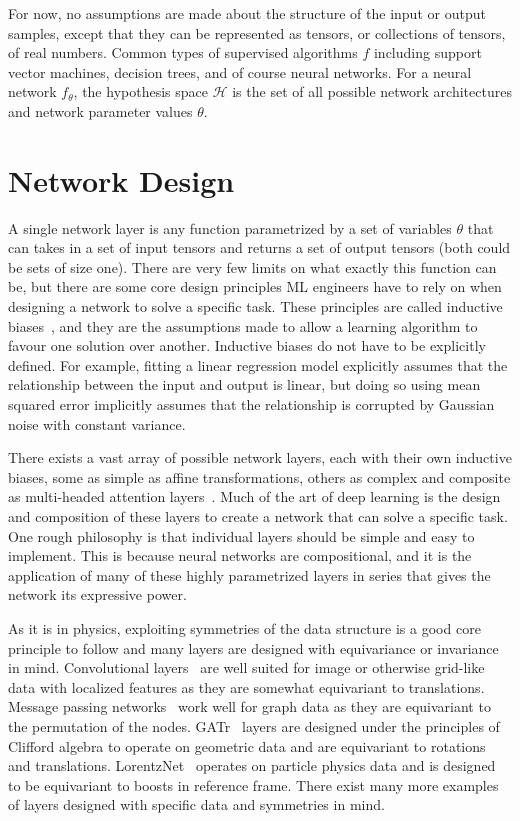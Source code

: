 For now, no assumptions are made about the structure of the input or output samples, except that they can be represented as tensors, or collections of tensors, of real numbers.
Common types of supervised algorithms $f$ including support vector machines, decision trees, and of course neural networks.
For a neural network $f_{\theta}$, the hypothesis space $\mathcal{H}$ is the set of all possible network architectures and network parameter values $\theta$.

\section{Network Design}

A single network layer is any function parametrized by a set of variables $\theta$ that can takes in a set of input tensors and returns a set of output tensors (both could be sets of size one).
There are very few limits on what exactly this function can be, but there are some core design principles ML engineers have to rely on when designing a network to solve a specific task.
These principles are called inductive biases~\cite{InductiveBiases1, InductiveBiases2}, and they are the assumptions made to allow a learning algorithm to favour one solution over another.
Inductive biases do not have to be explicitly defined.
For example, fitting a linear regression model explicitly assumes that the relationship between the input and output is linear, but doing so using mean squared error implicitly assumes that the relationship is corrupted by Gaussian noise with constant variance.

There exists a vast array of possible network layers, each with their own inductive biases, some as simple as affine transformations, others as complex and composite as multi-headed attention layers~\cite{Attention}.
Much of the art of deep learning is the design and composition of these layers to create a network that can solve a specific task.
One rough philosophy is that individual layers should be simple and easy to implement.
This is because neural networks are compositional, and it is the application of many of these highly parametrized layers in series that gives the network its expressive power.

As it is in physics, exploiting symmetries of the data structure is a good core principle to follow and many layers are designed with equivariance or invariance in mind.
Convolutional layers~\cite{DeepLearning} are well suited for image or otherwise grid-like data with localized features as they are somewhat equivariant to translations.
Message passing networks~\cite{NeuralMessagePassing} work well for graph data as they are equivariant to the permutation of the nodes.
GATr~\cite{GeometricAlgebraTransformer} layers are designed under the principles of Clifford algebra to operate on geometric data and are equivariant to rotations and translations.
LorentzNet~\cite{LorentzNet} operates on particle physics data and is designed to be equivariant to boosts in reference frame.
There exist many more examples of layers designed with specific data and symmetries in mind.

